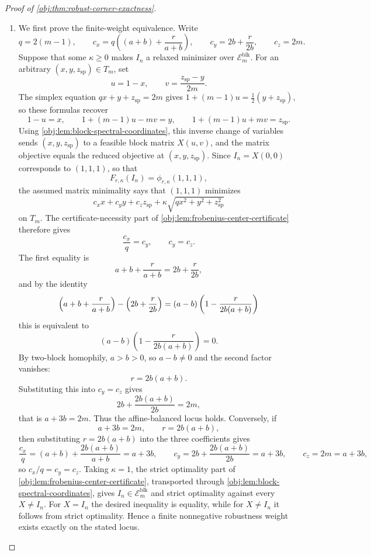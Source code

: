 \documentclass[11pt]{article}
\begin{document}
\begin{proof}[Proof of \cref{obj:thm:robust-corner-exactness}]
\begin{enumerate}
\item We first prove the finite-weight equivalence.  Write
\[
q=2(m-1),\qquad
c_x=q\left((a+b)+\frac r{a+b}\right),\qquad
c_y=2b+\frac r{2b},\qquad
c_z=2m .
\]
Suppose that some \(\kappa\ge 0\) makes \(I_n\) a relaxed minimizer over
\(\mathcal E_m^{\mathrm{blk}}\).  For an arbitrary
\((x,y,z_{\mathrm{sp}})\in T_m\), set
\[
u=1-x,\qquad v=\frac{z_{\mathrm{sp}}-y}{2m}.
\]
The simplex equation \(qx+y+z_{\mathrm{sp}}=2m\) gives \(1+(m-1)u=\tfrac12(y+z_{\mathrm{sp}})\), so these formulas recover
\[
1-u=x,\qquad
1+(m-1)u-mv=y,\qquad
1+(m-1)u+mv=z_{\mathrm{sp}} .
\]
Using \cref{obj:lem:block-spectral-coordinates}, this inverse change of variables sends
\((x,y,z_{\mathrm{sp}})\) to a feasible block matrix \(X(u,v)\), and the matrix
objective equals the reduced objective at \((x,y,z_{\mathrm{sp}})\).  Since
\(I_n=X(0,0)\) corresponds to \((1,1,1)\), so that
\[
F_{r,\kappa}(I_n)=\phi_{r,\kappa}(1,1,1),
\]
the assumed matrix minimality says that
\((1,1,1)\) minimizes
\[
c_xx+c_yy+c_zz_{\mathrm{sp}}
+\kappa\sqrt{q x^2+y^2+z_{\mathrm{sp}}^2}
\]
on \(T_m\).  The certificate-necessity part of
\cref{obj:lem:frobenius-center-certificate} therefore gives
\[
\frac{c_x}{q}=c_y,\qquad c_y=c_z .
\]
The first equality is
\[
a+b+\frac r{a+b}=2b+\frac r{2b},
\]
and by the identity
\[
\Bigl(a+b+\frac r{a+b}\Bigr)-\Bigl(2b+\frac r{2b}\Bigr)
=(a-b)\left(1-\frac{r}{2b(a+b)}\right)
\]
this is equivalent to
\[
(a-b)\left(1-\frac{r}{2b(a+b)}\right)=0.
\]
By two-block homophily, \(a>b>0\), so \(a-b\ne0\) and the second factor vanishes:
\[
r=2b(a+b).
\]
Substituting this into \(c_y=c_z\) gives
\[
2b+\frac{2b(a+b)}{2b}=2m,
\]
that is \(a+3b=2m\).  Thus the affine-balanced locus holds. %
Conversely, if
\[
a+3b=2m,\qquad r=2b(a+b),
\]
then substituting \(r=2b(a+b)\) into the three coefficients gives
\[
\frac{c_x}{q}=(a+b)+\frac{2b(a+b)}{a+b}=a+3b,
\qquad
c_y=2b+\frac{2b(a+b)}{2b}=a+3b,
\qquad
c_z=2m=a+3b,
\]
so \(c_x/q=c_y=c_z\). %
Taking \(\kappa=1\), the strict
optimality part of \cref{obj:lem:frobenius-center-certificate}, transported through
\cref{obj:lem:block-spectral-coordinates}, gives \(I_n\in\mathcal E_m^{\mathrm{blk}}\)
and strict optimality against every \(X\ne I_n\).  For \(X=I_n\) the desired inequality
is equality, while for \(X\ne I_n\) it follows from strict optimality.  Hence a finite
nonnegative robustness weight exists exactly on the stated locus. %


\end{enumerate}
\end{proof}
\end{document}

